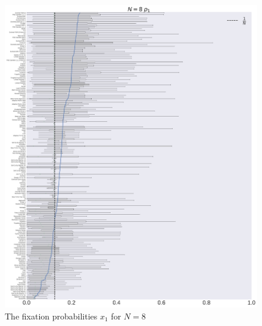 \documentclass[10pt,letterpaper]{article}
\begin{document}
\begin{figure}[!hbtp]
    \centering
    \includegraphics[width=\textwidth]{./boxplot_8_invade.pdf}
    \caption{The fixation probabilities \(x_1\) for \(N=8\)}
\end{figure}
\end{document}
